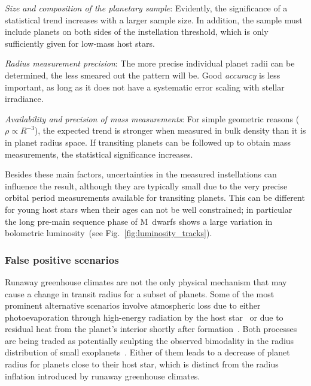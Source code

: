 \documentclass[twocolumn,twocolappendix]{aastex631}
\begin{document}
\textit{Size and composition of the planetary sample}: Evidently, the significance of a statistical trend increases with a larger sample size. In addition, the sample must include planets on both sides of the instellation threshold, which is only sufficiently given for low-mass host stars.

\textit{Radius measurement precision}: The more precise individual planet radii can be determined, the less smeared out the pattern will be. Good \textit{accuracy} is less important, as long as it does not have a systematic error scaling with stellar irradiance.

\textit{Availability and precision of mass measurements}: For simple geometric reasons ($\rho \propto R^{-3}$), the expected trend is stronger when measured in bulk density than it is in planet radius space. If transiting planets can be followed up to obtain mass measurements, the statistical significance increases.

Besides these main factors, uncertainties in the measured instellations can influence the result, although they are typically small due to the very precise orbital period measurements available for transiting planets.
This can be different for young host stars when their ages can not be well constrained; in particular the long pre-main sequence phase of M~dwarfs shows a large variation in bolometric luminosity~(see Fig.~\ref{fig:luminosity_tracks}).


\subsubsection{False positive scenarios}\label{sec:dis_falsepositive}
Runaway greenhouse climates are not the only physical mechanism that may cause a change in transit radius for a subset of planets.
Some of the most prominent alternative scenarios involve atmospheric loss due to either photoevaporation through high-energy radiation by the host star~\citep[e.g.,][]{Owen2013,Jin2014,Mordasini2020a} or due to residual heat from the planet's interior shortly after formation~\citep{Ginzburg2016b,Ginzburg2018,Gupta2019}.
Both processes are being traded as potentially sculpting the observed bimodality in the radius distribution of small exoplanets~\citep{Fulton2017,VanEylen2018}.
Either of them leads to a decrease of planet radius for planets close to their host star, which is distinct from the radius inflation introduced by runaway greenhouse climates.
\end{document}
